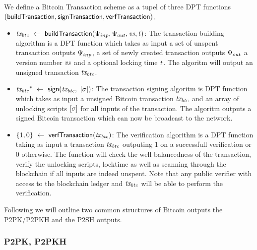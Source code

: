 \begin{definition}
    We define a Bitcoin Transaction scheme as a tupel of three DPT functions $(\mathsf{buildTransaction},
    \mathsf{signTransaction}, \mathsf{verfTransaction})$.
    \begin{itemize}
        \item $\mathit{tx_{btc}} ~\leftarrow~ \mathsf{buildTransaction}(\Psi_{inp},\Psi_{out},\mathit{vs},\mathit{t})$: The
        transaction building algorithm is a DPT function which takes as input a set of unspent transaction outputs
        $\Psi_{inp}$, a set of newly created transaction outputs $\Psi_{out}$ a version number $\mathit{vs}$
        and a optional locking time $\mathit{t}$. The algoritm will output an unsigned transaction $\mathit{tx_{btc}}$.
        \item $\mathit{tx_{btc}}^* ~\leftarrow~ \mathsf{sign}(\mathit{tx_{btc}} ,~ [\mathit{\sigma}])$: The transaction
        signing algoritm is DPT function which takes as input a unsigned Bitcoin transaction $\mathit{tx_{btc}}$ and an array
        of unlocking scripts $[\mathit{\sigma}]$ for all inputs of the transaction. The algoritm outputs a
        signed Bitcoin transaction which can now be broadcast to the network.
        \item $\{ 1,0 \} ~\leftarrow~ \mathsf{verfTransaction}(\mathit{tx_{btc}})$: The verification algorithm is a DPT function
        taking as input a transaction $\mathit{tx_{btc}}$ outputing 1 on a successfull verification or 0 otherwise. The
        function will check the well-balancedness of the transaction, verify the unlocking scripts, locktime
        as well as scanning through the blockchain if all inputs are indeed unspent.
        Note that any public verifier with access to the blockchain ledger and $\mathit{tx_{btc}}$ will be able to perform the verification.
    \end{itemize}
\end{definition}

Following we will outline two common structures of Bitcoin outputs the P2PK/P2PKH and the P2SH outputs.

\subsubsection{P2PK, P2PKH\label{subsubsec:p2pk}}


